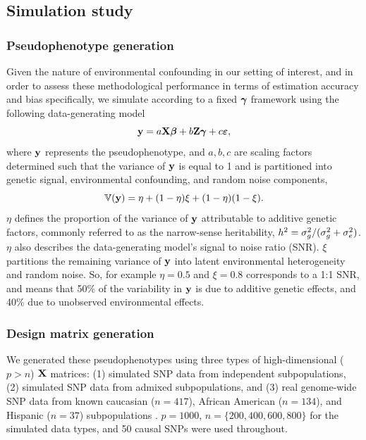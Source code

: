 \subsection{Simulation study}
\subsubsection{Pseudophenotype generation}

Given the nature of environmental confounding in our setting of interest, and in order to assess these methodological performance in terms of estimation accuracy and bias specifically, we simulate according to a fixed $\boldsymbol{\gamma}$ framework using the following data-generating model
\begin{equation}
    \label{eqn:sim}
    \textbf{y} = a \textbf{X} \boldsymbol{\beta}{} + b \textbf{Z} \boldsymbol{\gamma} + c \boldsymbol{\varepsilon}{},
\end{equation}
where $\textbf{y}$ represents the pseudophenotype, and $a, b, c$ are scaling factors determined such that the variance of $\textbf{y}$ is equal to 1 and is partitioned into genetic signal, environmental confounding, and random noise components,
\begin{equation}
    \label{eqn:parition_y}
    \mathbb{V}(\textbf{y}) = \eta + (1 - \eta) \xi + (1-\eta)(1-\xi).
\end{equation}
$\eta$ defines the proportion of the variance of $\textbf{y}$ attributable to additive genetic factors, commonly referred to as the narrow-sense heritability, $h^2 = \sigma^2_g/(\sigma^2_g + \sigma^2_e)$. $\eta$ also describes the data-generating model's signal to noise ratio (SNR). $\xi$ partitions the remaining variance of $\textbf{y}$ into latent environmental heterogeneity and random noise. So, for example $\eta = 0.5$ and $\xi = 0.8$ corresponds to a 1:1 SNR, and means that 50\% of the variability in $\textbf{y}$ is due to additive genetic effects, and 40\% due to unobserved environmental effects. 

\subsubsection{Design matrix generation}
We generated these pseudophenotypes using three types of high-dimensional ($p > n$) $\textbf{X}$ matrices: (1) simulated SNP data from independent subpopulations, (2) simulated SNP data from admixed subpopulations, and (3) real genome-wide SNP data from known caucasian ($n = 417$), African American ($n = 134$), and Hispanic ($n = 37$) subpopulations . $p = 1000$, $n = \{200, 400, 600, 800 \}$ for the simulated data types, and 50 causal SNPs were used throughout. 

